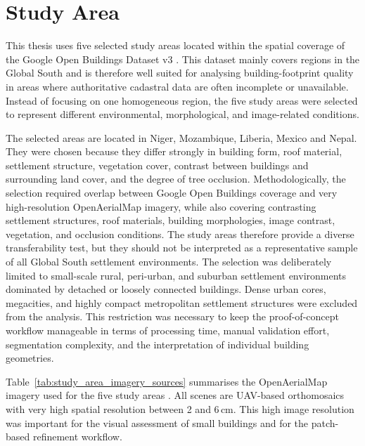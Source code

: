 \chapter{Study Area}
\label{ch:study_area}

This thesis uses five selected study areas located within the spatial coverage of the Google Open Buildings Dataset v3 \citep{sirko2021continentalscalebuildingdetectionhigh, googleopenbuildings}. This dataset mainly covers regions in the Global South and is therefore well suited for analysing building-footprint quality in areas where authoritative cadastral data are often incomplete or unavailable. Instead of focusing on one homogeneous region, the five study areas were selected to represent different environmental, morphological, and image-related conditions.

The selected areas are located in Niger, Mozambique, Liberia, Mexico and Nepal. They were chosen because they differ strongly in building form, roof material, settlement structure, vegetation cover, contrast between buildings and surrounding land cover, and the degree of tree occlusion. Methodologically, the selection required overlap between Google Open Buildings coverage and very high-resolution OpenAerialMap imagery, while also covering contrasting settlement structures, roof materials, building morphologies, image contrast, vegetation, and occlusion conditions. The study areas therefore provide a diverse transferability test, but they should not be interpreted as a representative sample of all Global South settlement environments. The selection was deliberately limited to small-scale rural, peri-urban, and suburban settlement environments dominated by detached or loosely connected buildings. Dense urban cores, megacities, and highly compact metropolitan settlement structures were excluded from the analysis. This restriction was necessary to keep the proof-of-concept workflow manageable in terms of processing time, manual validation effort, segmentation complexity, and the interpretation of individual building geometries.

Table~\ref{tab:study_area_imagery_sources} summarises the OpenAerialMap imagery used for the five study areas \citep{openaerialmap}. All scenes are UAV-based orthomosaics with very high spatial resolution between 2 and 6\,cm. This high image resolution was important for the visual assessment of small buildings and for the patch-based refinement workflow.


